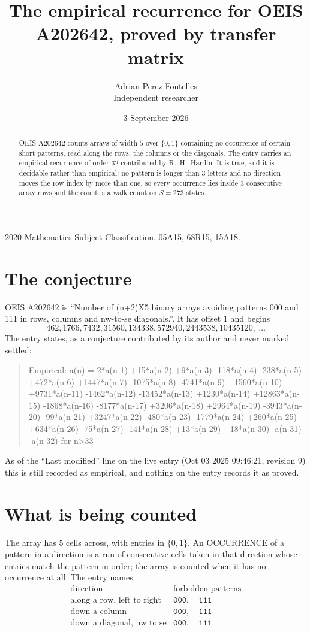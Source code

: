 \documentclass[11pt,a4paper]{article}
\title{The empirical recurrence for OEIS A202642, proved by transfer matrix}
\author{Adrian Perez Fontelles\\ \small Independent researcher}
\date{3 September 2026}
\theoremstyle{plain}
\theoremstyle{definition}
\begin{document}
\maketitle

\begin{abstract}
OEIS A202642 counts arrays of width $5$ over $\{0,1\}$ containing no occurrence of certain short
patterns, read along the rows, the columns or the diagonals. The entry carries an empirical
recurrence of order $32$ contributed by R.~H.~Hardin. It is true, and it is decidable
rather than empirical: no pattern is longer than $3$ letters and no direction moves the row
index by more than one, so every occurrence lies inside $3$ consecutive array rows and the
count is a walk count on $S=273$ states.
\end{abstract}

\noindent\small 2020 Mathematics Subject Classification. 05A15, 68R15, 15A18.\normalsize

\section{The conjecture}

OEIS A202642 is ``Number of (n+2)X5 binary arrays avoiding patterns 000 and 111 in rows, columns and nw-to-se diagonals.''. It has offset $1$ and begins
\[
462, 1766, 7432, 31560, 134338, 572940, 2443538, 10435120,\ \dots
\]
The entry states, as a conjecture contributed by its author and never marked settled:
\begin{quote}
Empirical: a(n) = 2*a(n-1) +15*a(n-2) +9*a(n-3) -118*a(n-4) -238*a(n-5) +472*a(n-6) +1447*a(n-7) -1075*a(n-8) -4741*a(n-9) +1560*a(n-10) +9731*a(n-11) -1462*a(n-12) -13452*a(n-13) +1230*a(n-14) +12863*a(n-15) -1868*a(n-16) -8177*a(n-17) +3206*a(n-18) +2964*a(n-19) -3943*a(n-20) -99*a(n-21) +3247*a(n-22) -480*a(n-23) -1779*a(n-24) +260*a(n-25) +634*a(n-26) -75*a(n-27) -141*a(n-28) +13*a(n-29) +18*a(n-30) -a(n-31) -a(n-32) for n>33
\end{quote}
As of the ``Last modified'' line on the live entry (Oct 03 2025 09:46:21, revision 9) this is still
recorded as empirical, and nothing on the entry records it as proved.

\section{What is being counted}

The array has $5$ cells across, with entries in $\{0,1\}$. An OCCURRENCE of a pattern in a
direction is a run of consecutive cells taken in that direction whose entries match the pattern
in order; the array is counted when it has no occurrence at all. The entry names
\[
\begin{array}{ll}
\text{direction} & \text{forbidden patterns} \\[2pt]
\text{along a row, left to right} & \mathtt{000},\quad \mathtt{111} \\
\text{down a column} & \mathtt{000},\quad \mathtt{111} \\
\text{down a diagonal, nw to se} & \mathtt{000},\quad \mathtt{111} \\
\end{array}
\]
\end{document}
